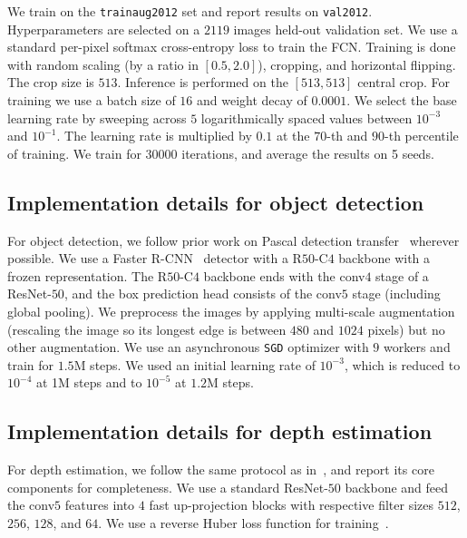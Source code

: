 We train on the \texttt{train\textunderscore aug2012\xspace} set and report results on \texttt{val2012\xspace}. Hyperparameters are selected on a $2119$ images held-out validation set. We use a standard per-pixel softmax cross-entropy loss to train the FCN. Training is done with random scaling (by a ratio in $\left[0.5, 2.0\right]$), cropping, and horizontal flipping. The crop size is $513$. Inference is performed on the $\left[513, 513\right]$ central crop. For training we use a batch size of $16$ and weight decay of $0.0001$. We select the base learning rate by sweeping across $5$ logarithmically spaced values between $10^{-3}$ and $10^{-1}$. The learning rate is multiplied by $0.1$ at the $70$-th and $90$-th percentile of training. We train for $30000$ iterations, and average the results on 5 seeds.

\subsection{Implementation details for object detection }
\label{app:object_det}

For object detection, we follow prior work on Pascal detection transfer~\cite{doersch2017multi,doersch2015unsupervised} wherever possible.  We use a Faster R-CNN~\cite{ren2015faster} detector with a R$50$-C$4$ backbone with a frozen representation. The R$50$-C$4$ backbone ends with the conv$4$ stage of a ResNet-$50$, and the box prediction head consists of the conv$5$ stage (including global pooling).
We preprocess the images by applying multi-scale augmentation (rescaling the image so its longest edge is between $480$ and $1024$ pixels) but no other augmentation. We use an asynchronous \texttt{SGD} optimizer with $9$ workers and train for $1.5$M steps. We used an initial learning rate of $10^{-3}$, which is reduced to $10^{-4}$ at 1M steps and to $10^{-5}$ at $1.2$M steps.

\subsection{Implementation details for depth estimation }
\label{app:depth}
For depth estimation, we follow the same protocol as in~\cite{laina2016depth}, and report its core components for completeness.
We use a standard ResNet-$50$ backbone and feed the conv$5$ features into $4$ fast up-projection blocks with respective filter sizes $512$, $256$, $128$, and $64$. We use a reverse Huber loss function for training~\cite{laina2016depth, owen2007robust}.


